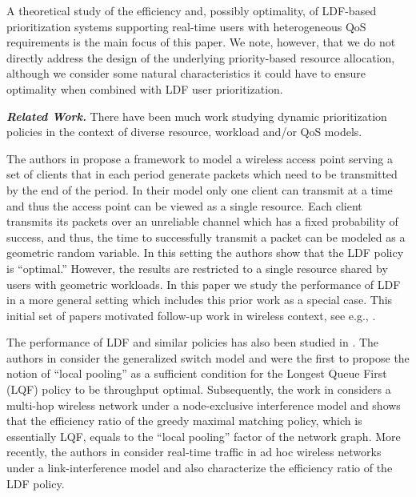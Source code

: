 \documentclass[prodmode,acmtompecs]{acmsmall}
\begin{document}
A theoretical study of the efficiency and, possibly optimality, of LDF-based prioritization 
systems supporting real-time users with heterogeneous QoS requirements 
is the main focus of this paper. We note, however, that we do not directly address the design
of the underlying priority-based resource allocation, although we consider some natural
characteristics it could have to ensure optimality when combined with LDF user prioritization.




{\bf \em Related Work. }
There have been much work studying dynamic prioritization policies in the context of diverse resource, workload and/or QoS models. 

The authors in \cite{HoK12,HoK13b} propose a framework to model a wireless access point serving a set of clients that in each period generate packets which need to be transmitted by the end of the period. 
In their model only one client can transmit at a time and thus the access point can be viewed as a single resource. Each client transmits its packets over an unreliable channel which has a fixed probability of success, and thus, the time to successfully transmit a packet can be modeled as a geometric random variable. In this setting the authors show that the LDF policy is ``optimal.'' 
However, the results are restricted to a single resource shared by users with geometric workloads. In this paper we study the performance of LDF in a more general setting which includes this prior work as a special case. 
This initial set of papers motivated follow-up work in wireless context, see e.g., \cite{HoK14,MLH10,JaS11}. 


The performance of LDF and similar policies has also been studied in \cite{MCK95,DiW06,JLS07,KWJ13}. The authors in \cite{DiW06} consider the generalized switch model and were the first to propose the notion of ``local pooling'' as a sufficient condition for the Longest Queue First (LQF) policy to be throughput optimal. 
Subsequently, the work in \cite{JLS07} considers a multi-hop wireless network under a node-exclusive interference model and shows that the efficiency ratio of the greedy maximal matching policy, which is essentially LQF, equals to the ``local pooling'' factor of the network graph. More recently, the authors in \cite{KWJ13} consider real-time traffic in ad hoc wireless networks under a link-interference model and also characterize the efficiency ratio of the LDF policy. 
\end{document}

